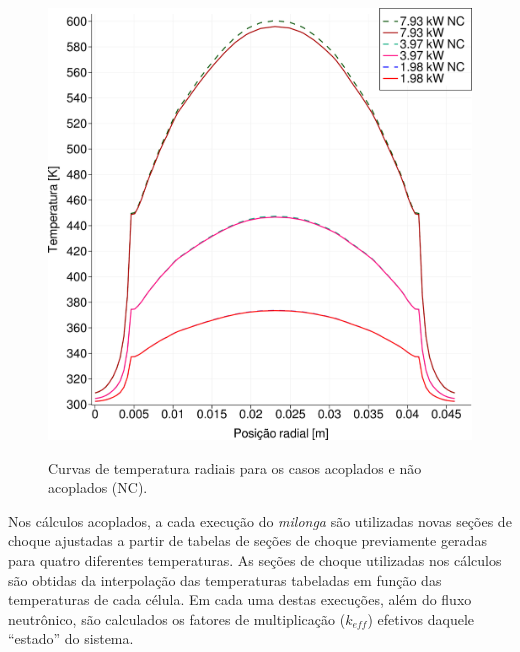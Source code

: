 \begin{figure}[htb]
  \caption{Curvas de temperatura radiais para os casos acoplados e não acoplados (NC).}
  \centering\includegraphics[scale=0.5]{figuras/T_x_all_square_port.png}
  \label{fig:T_all_x}
\end{figure}

Nos cálculos acoplados, a cada execução do \textit{milonga} são utilizadas
novas seções de choque ajustadas a partir de tabelas de seções de choque previamente geradas
para quatro diferentes temperaturas. As seções de choque utilizadas nos cálculos
são obtidas da interpolação
das temperaturas tabeladas em função das temperaturas de cada célula. Em cada uma destas
execuções, além do fluxo neutrônico, são calculados os fatores de multiplicação
($k_{eff}$) efetivos daquele ``estado'' do sistema.

